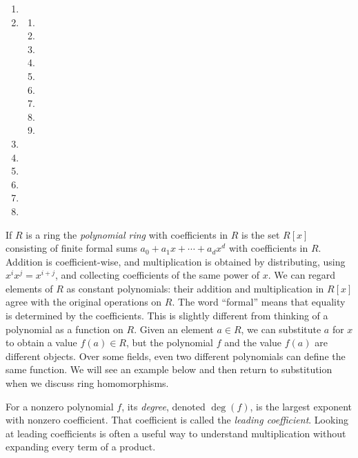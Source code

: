 \documentclass[Notebook.tex]{subfiles}
\begin{document}
\begin{solution}
	\bbni
	\begin{enumerate}[label=(\alph*),ref=\theenumi\alph*]
		\item
		\item
		\begin{enumerate}[label=(\roman*),ref=\theenumi\roman*]
			\item
			\item
			\item
			\item
			\item
			\item
			\item
			\item
			\item
		\end{enumerate}
		\item
		\item
		\item
		\item
		\item
		\item
	\end{enumerate}
\end{solution}

\newpage

If $R$ is a ring the \emph{polynomial ring} with coefficients in $R$ is the set $R[x]$ consisting of finite formal sums $a_0+a_1x+\cdots+a_dx^d$ with coefficients in $R$. Addition is coefficient-wise, and multiplication is obtained by distributing, using $x^ix^j=x^{i+j}$, and collecting coefficients of the same power of $x$. We can regard elements of $R$ as constant polynomials: their addition and multiplication in $R[x]$ agree with the original operations on $R$. The word ``formal'' means that equality is determined by the coefficients. This is slightly different from thinking of a polynomial as a function on $R$. Given an element $a\in R$, we can substitute $a$ for $x$ to obtain a value $f(a) \in R$, but the polynomial $f$ and the value $f(a)$ are different objects. Over some fields, even two different polynomials can define the same function. We will see an example below and then return to substitution when we discuss ring homomorphisms.

For a nonzero polynomial $f$, its \emph{degree}, denoted $\deg(f)$, is the largest exponent with nonzero coefficient. That coefficient is called the \emph{leading coefficient}. Looking at leading coefficients is often a useful way to understand multiplication without expanding every term of a product.
\end{document}
